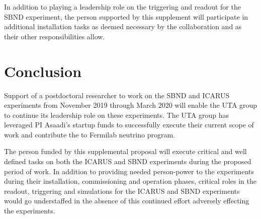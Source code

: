 In addition to playing a leadership role on the triggering and readout for the SBND experiment, the person supported by this supplement will participate in additional installation tasks as deemed necessary by the collaboration and as their other responsibilities allow. 

\section*{Conclusion}

Support of a postdoctoral researcher to work on the SBND and ICARUS experiments from November 2019 through March 2020 will enable the UTA group to continue its leadership role on these experiments. The UTA group has leveraged PI Asaadi's startup funds to successfully execute their current scope of work and contribute the to Fermilab neutrino program. 

The person funded by this supplemental proposal will execute critical and well defined tasks on both the ICARUS and SBND experiments during the proposed period of work. In addition to providing needed person-power to the experiments during their installation, commissioning and operation phases, critical roles in the readout, triggering and simulations for the ICARUS and SBND experiments would go understaffed in the absence of this continued effort adversely effecting the experiments. 